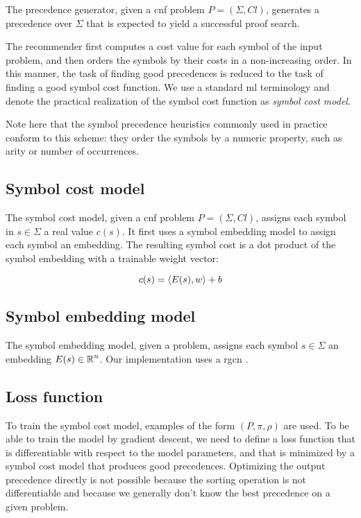 The precedence generator, given a \gls{cnf} problem $P = (\Sigma, \mathit{Cl})$,
generates a precedence over $\Sigma$
that is expected to yield a successful proof search.

The recommender first computes a cost value for each symbol of the input problem,
and then orders the symbols by their costs in a non-increasing order.
In this manner, the task of finding good precedences is reduced to the task
of finding a good symbol cost function.
We use a standard \gls{ml} terminology and denote
the practical realization of the symbol cost function as \emph{symbol cost model}.

Note here that the symbol precedence heuristics commonly used in practice
conform to this scheme:
they order the symbols by a numeric property, such as arity or number of occurrences.

\subsection{Symbol cost model}

The symbol cost model, given a \gls{cnf} problem $P = (\Sigma, \mathit{Cl})$,
assigns each symbol in $s \in \Sigma$ a real value $c(s)$.
It first uses a symbol embedding model to assign each symbol an embedding.
The resulting symbol cost is a dot product of the symbol embedding with a trainable weight vector:

$$
c(s) = \left<E(s),w\right> + b
$$

\subsection{Symbol embedding model}

The symbol embedding model, given a problem,
assigns each symbol $s \in \Sigma$ an embedding $E(s) \in \operatorname{\mathbb{R}}^n$.
Our implementation uses a \gls{rgcn} \cite{}.


\subsection{Loss function}

To train the symbol cost model,
examples of the form $(P, \pi, \rho)$ are used.
To be able to train the model by gradient descent,
we need to define a loss function that is differentiable with respect to the model parameters,
and that is minimized by a symbol cost model that produces good precedences.
Optimizing the output precedence directly is not possible
because the sorting operation is not differentiable
and because we generally don't know the best precedence on a given problem.

